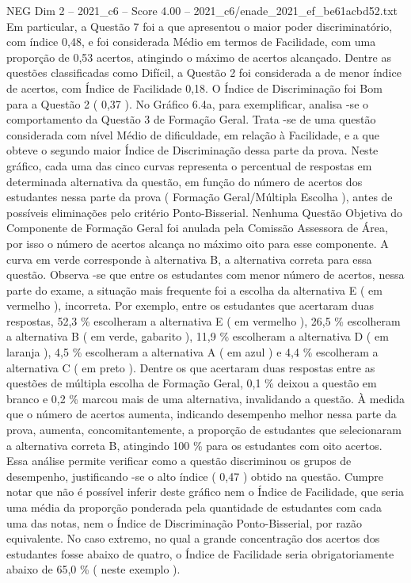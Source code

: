 \begin{textsample}{NEG Dim 2 – 2021\_c6 – Score 4.00 – 2021\_c6/enade\_2021\_ef\_be61acbd52.txt}
Em particular, a Questão 7 foi a que apresentou o maior poder discriminatório, com índice 0,48, e foi considerada Médio em termos de Facilidade, com uma proporção de 0,53 acertos, atingindo o máximo de acertos alcançado.
Dentre as questões classificadas como Difícil, a Questão 2 foi considerada a de menor índice de acertos, com Índice de Facilidade 0,18.
O Índice de Discriminação foi Bom para a Questão 2 ( 0,37 ).
No Gráfico 6.4a, para exemplificar, analisa -se o comportamento da Questão 3 de Formação Geral.
Trata -se de uma questão considerada com nível Médio de dificuldade, em relação à Facilidade, e a que obteve o segundo maior Índice de Discriminação dessa parte da prova.
Neste gráfico, cada uma das cinco curvas representa o percentual de respostas em determinada alternativa da questão, em função do número de acertos dos estudantes nessa parte da prova ( Formação Geral/Múltipla Escolha ), antes de possíveis eliminações pelo critério Ponto-Bisserial.
Nenhuma Questão Objetiva do Componente de Formação Geral foi anulada pela Comissão Assessora de Área, por isso o número de acertos alcança no máximo oito para esse componente.
A curva em verde corresponde à alternativa B, a alternativa correta para essa questão.
Observa -se que entre os estudantes com menor número de acertos, nessa parte do exame, a situação mais frequente foi a escolha da alternativa E ( em vermelho ), incorreta.
Por exemplo, entre os estudantes que acertaram duas respostas, 52,3 \% escolheram a alternativa E ( em vermelho ), 26,5 \% escolheram a alternativa B ( em verde, gabarito ), 11,9 \% escolheram a alternativa D ( em laranja ), 4,5 \% escolheram a alternativa A ( em azul ) e 4,4 \% escolheram a alternativa C ( em preto ).
Dentre os que acertaram duas respostas entre as questões de múltipla escolha de Formação Geral, 0,1 \% deixou a questão em branco e 0,2 \% marcou mais de uma alternativa, invalidando a questão.
À medida que o número de acertos aumenta, indicando desempenho melhor nessa parte da prova, aumenta, concomitantemente, a proporção de estudantes que selecionaram a alternativa correta B, atingindo 100 \% para os estudantes com oito acertos.
Essa análise permite verificar como a questão discriminou os grupos de desempenho, justificando -se o alto índice ( 0,47 ) obtido na questão.
Cumpre notar que não é possível inferir deste gráfico nem o Índice de Facilidade, que seria uma média da proporção ponderada pela quantidade de estudantes com cada uma das notas, nem o Índice de Discriminação Ponto-Bisserial, por razão equivalente.
No caso extremo, no qual a grande concentração dos acertos dos estudantes fosse abaixo de quatro, o Índice de Facilidade seria obrigatoriamente abaixo de 65,0 \% ( neste exemplo ).

\end{textsample}

